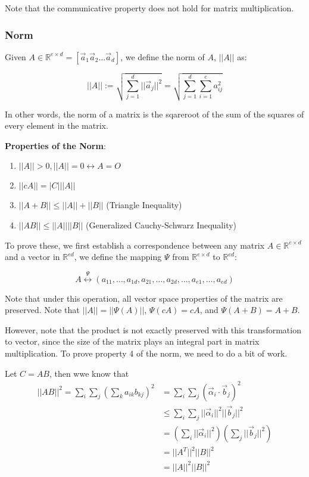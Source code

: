 \documentclass[11 pt, twoside]{article}
\begin{document}
Note that the communicative property does not hold for matrix multiplication.

\subsubsection{Norm}

Given $A \in \mathbb{R}^{e \times d} = [\vec{a}_1  \vec{a}_2  \dots 
\vec{a}_d]$, we define the norm of $A$, $||A||$ as:

\[
||A|| := \sqrt{\sum_{j = 1}^d ||\vec{a}_j||^2} = \sqrt{\sum_{j=1}^d
\sum_{i=1}^e a_{ij}^2}
\]

In other words, the norm of a matrix is the sqareroot of the sum of the squares
of every element in the matrix.

\textbf{Properties of the Norm}:
\begin{enumerate}
\item $||A|| > 0, ||A|| = 0 \leftrightarrow A = O$
\item $||cA|| = |C|||A||$
\item $||A+B|| \leq ||A|| + ||B||$ (Triangle Inequality)
\item $||AB|| \leq ||A||||B||$ (Generalized Cauchy-Schwarz Inequality)
\end{enumerate}

To prove these, we first establish a correspondence between any matrix $A \in
\mathbb{R}^{e \times d}$ and a vector in $\mathbb{R}^{ed}$, we define the
mapping $\Psi$ from $\mathbb{R}^{e \times d}$ to $\mathbb{R}^{ed}$:

\[
A \overset{\Psi}{\longleftrightarrow} (a_{11}, \dots, a_{1d}, a_{21}, \dots,
a_{2d}, \dots, a_{e1}, \dots, a_{ed})
\]

Note that under this operation, all vector space properties of the matrix are
preserved. Note that $||A|| = ||\Psi(A)||$, $\Psi(cA) = cA$, and $\Psi(A + B) =
A + B$.

However, note that the product is not exactly preserved with this transformation
to vector, since the size of the matrix plays an integral part in matrix
multiplication. To prove property 4 of the norm, we need to do a bit of work.

Let $C = AB$, then wwe know that
\begin{align*}
||AB||^2 = \sum_i \sum_j \left(\sum_k a_{ik}b_{kj}\right)^2 &= \sum_i \sum_j
(\vec{\alpha}_i \cdot \vec{b}_j)^2 \\
&\leq \sum_i \sum_j ||\vec{\alpha}_i||^2 ||\vec{b}_j||^2\\
&= (\sum_i ||\vec{\alpha}_i||^2)(\sum_j ||\vec{b}_j||^2)\\
&= ||A^T||^2 ||B||^2\\
&= ||A||^2 ||B||^2
\end{align*}
\end{document}
